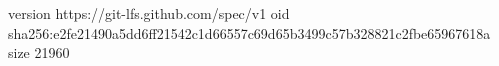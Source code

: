 version https://git-lfs.github.com/spec/v1
oid sha256:e2fe21490a5dd6ff21542c1d66557c69d65b3499c57b328821c2fbe65967618a
size 21960
